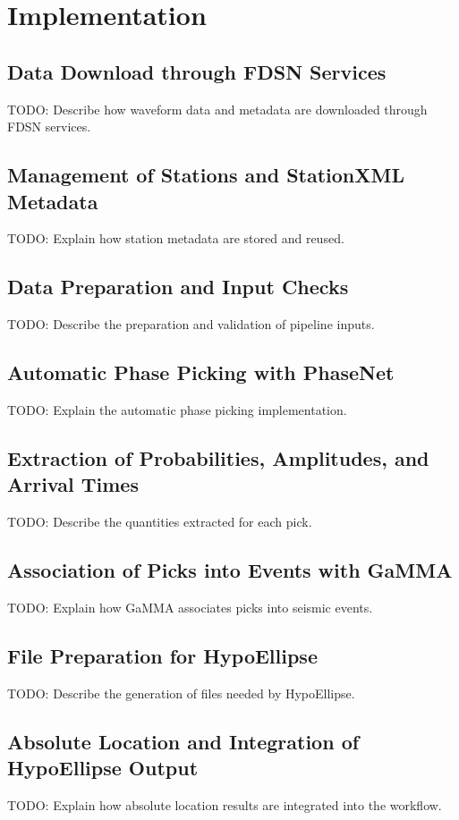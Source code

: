 \chapter{Implementation}

\section{Data Download through FDSN Services}
TODO: Describe how waveform data and metadata are downloaded through FDSN services.

\section{Management of Stations and StationXML Metadata}
TODO: Explain how station metadata are stored and reused.

\section{Data Preparation and Input Checks}
TODO: Describe the preparation and validation of pipeline inputs.

\section{Automatic Phase Picking with PhaseNet}
TODO: Explain the automatic phase picking implementation.

\section{Extraction of Probabilities, Amplitudes, and Arrival Times}
TODO: Describe the quantities extracted for each pick.

\section{Association of Picks into Events with GaMMA}
TODO: Explain how GaMMA associates picks into seismic events.

\section{File Preparation for HypoEllipse}
TODO: Describe the generation of files needed by HypoEllipse.

\section{Absolute Location and Integration of HypoEllipse Output}
TODO: Explain how absolute location results are integrated into the workflow.

